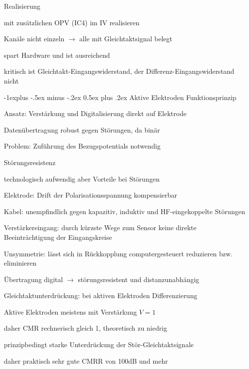 \documentclass[a4paper]{article}
\makeatletter
\renewcommand{\subsection}{\@startsection{subsection}{2}{0mm}%
 {-1explus -.5ex minus -.2ex}%
 {0.5ex plus .2ex}%
 {\normalfont\normalsize\bfseries}}
\makeatother
\begin{document}
\begin{multicols}{3}
  Realisierung
  \begin{itemize*}
    \item mit zusätzlichen OPV (IC4) im IV realisieren
    \item Kanäle nicht einzeln $\rightarrow$ alle mit Gleichtaktsignal belegt
    \item spart Hardware und ist ausreichend
    \item kritisch ist Gleichtakt-Eingangswiderstand, der Differenz-Eingangswiderstand nicht
  \end{itemize*}

  \subsection{Aktive Elektroden}\label{aktive-elektroden}
  Funktionsprinzip
  \begin{itemize*}
    \item Ansatz: Verstärkung und Digitalisierung direkt auf Elektrode
    \item Datenübertragung robust gegen Störungen, da binär
    \item Problem: Zuführung des Bezugspotentials notwendig
  \end{itemize*}

  Störungsresistenz
  \begin{itemize*}
    \item technologisch aufwendig aber Vorteile bei Störungen%
    \item Elektrode: Drift der Polarisationsspannung kompensierbar
    \item Kabel: unempfindlich gegen kapazitiv, induktiv und HF-eingekoppelte Störungen
    \item Verstärkereingang: durch kürzste Wege zum Sensor keine direkte Beeinträchtigung der Eingangskreise
    \item Unsymmetrie: lässt sich in Rückkopplung computergesteuert reduzieren bzw. eliminieren
    \item Übertragung digital $\rightarrow$ störungsresistent und distanzunabhängig
  \end{itemize*}

  Gleichtaktunterdrückung:
  bei aktiven Elektroden Differenzierung
  \begin{itemize*}
    \item Aktive Elektroden meistens mit Verstärkung $V=1$
    \item daher CMR rechnerisch gleich 1, theoretisch zu niedrig
    \item prinzipbedingt starke Unterdrückung der Stör-Gleichtaktsignale
    \item daher praktisch sehr gute CMRR von 100dB und mehr
  \end{itemize*}


\end{multicols}
\end{document}
